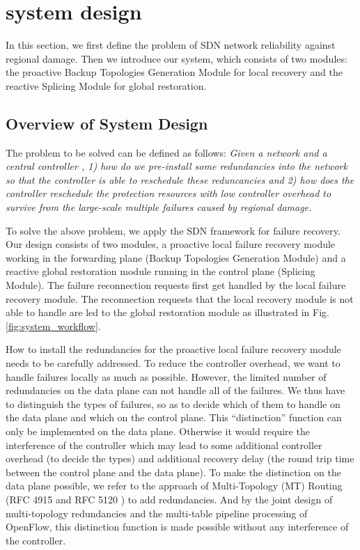 \documentclass[10pt,journal]{IEEEtran}
\begin{document}
\section{system design}\label{sec:system_design}
In this section, we first define the problem of SDN network reliability against regional damage. Then we introduce our system, which consists of two modules: the proactive Backup Topologies Generation Module for local recovery and the reactive Splicing Module for global restoration.

\subsection{Overview of System Design}\label{sec:overview-of-system-design}
The problem to be solved can be defined as follows: \emph{Given a network  and a central controller , 1) how do we pre-install some redundancies into the network so that the controller is able to reschedule these reduncancies and 2) how does the controller reschedule the protection resources with low controller overhead to survive from the large-scale multiple failures caused by regional damage.}

To solve the above problem, we apply the SDN framework for failure recovery. Our design consists of two modules, a proactive local failure recovery module working in the forwarding plane (Backup Topologies Generation Module) and a reactive global restoration module running in the control plane (Splicing Module). The failure reconnection requests first get handled by the local failure recovery module. The reconnection requests that the local recovery module is not able to handle are led to the global restoration module as illustrated in Fig. \ref{fig:system_workflow}.

How to install the redundancies for the proactive local failure recovery module needs to be carefully addressed. To reduce the controller overhead, we want to handle failures locally as much as possible. However,  the limited number of redundancies on the data plane can not handle all of the failures. We thus have to distinguish the types of failures, so as to decide which of them to handle on the data plane and which on the control plane. This ``distinction'' function can only be implemented on the data plane. Otherwise it would require the interference of the controller which may lead to some additional controller overhead (to decide the types) and additional recovery delay (the round trip time between the control plane and the data plane). To make the distinction on the data plane possible, we refer to the approach of Multi-Topology (MT) Routing (RFC 4915 and RFC 5120 \cite{psenak2007multi, przygienda2008m}) to add redundancies. And by the joint design of multi-topology redundancies and the multi-table pipeline processing of OpenFlow, this distinction function is made possible without any interference of the controller.
\end{document}

